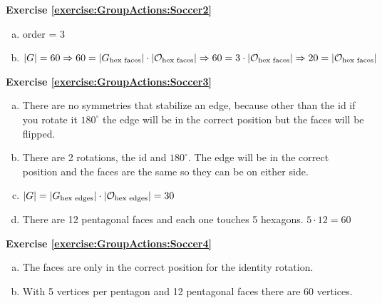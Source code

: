 \noindent\textbf{Exercise \ref{exercise:GroupActions:Soccer2}}
\begin{enumerate}[(a)]
\item
order = 3

\item
$|G| = 60 \implies 60 = |G_{\text{hex faces}}| \cdot |{\cal O}_{\text{hex faces}}| \implies 60 = 3 \cdot |{\cal O}_{\text{hex faces}}| \implies 20 = |{\cal O}_{\text{hex faces}}|$
\end{enumerate}

\noindent\textbf{Exercise \ref{exercise:GroupActions:Soccer3}}
\begin{enumerate}[(a)]
\item
There are no symmetries that stabilize an edge, because other than the id if you rotate it $180^{\circ}$ the edge will be in the correct position but the faces will be flipped.

\item
There are 2 rotations, the id and $180^{\circ}$.  The edge will be in the correct position and the faces are the same so they can be on either side.

\item
$|G| = |G_{\text{hex edges}}| \cdot |{\cal O}_{\text{hex edges}}| = 30$

\item
There are 12 pentagonal faces and each one touches 5 hexagons. $5 \cdot 12 = 60$
\end{enumerate}

\noindent\textbf{Exercise \ref{exercise:GroupActions:Soccer4}}
\begin{enumerate}[(a)]
\item
The faces are only in the correct position for the identity rotation.

\item
With 5 vertices per pentagon and 12 pentagonal faces there are 60 vertices.
\end{enumerate}


